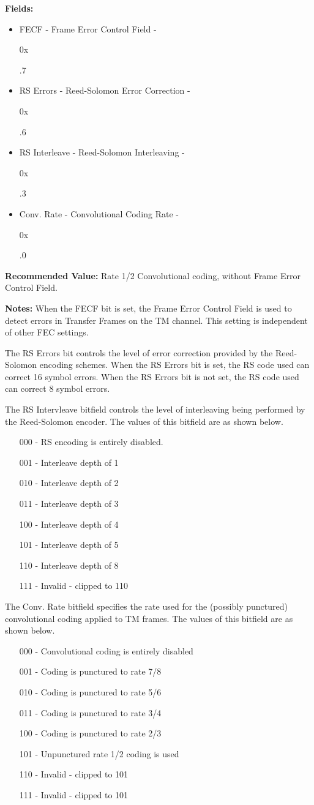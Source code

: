 \documentclass{hitec}
\newcounter{regaddr}
\newcounter{regsize}
\newcommand*{\curreg}[1][0]{%
		\addtocounter{regaddr}{\the\numexpr#1-\value{regsize}\relax}%
		0x\padzeroes[2]\Hexadecimal{regaddr}%
		\addtocounter{regaddr}{\the\numexpr\value{regsize}-#1\relax}%
}
\begin{document}
\noindent \textbf{Fields:}

\begin{itemize}
		\item FECF - Frame Error Control Field - \curreg.7
		\item RS Errors - Reed-Solomon Error Correction - \curreg.6
		\item RS Interleave - Reed-Solomon Interleaving - \curreg.3
		\item Conv. Rate - Convolutional Coding Rate - \curreg.0
\end{itemize}

\noindent \textbf{Recommended Value:} Rate 1/2 Convolutional coding, without
Frame Error Control Field.

\noindent \textbf{Notes:} When the FECF bit is set, the Frame Error Control
Field is used to detect errors in Transfer Frames on the TM channel. This
setting is independent of other FEC settings.

The RS Errors bit controls the level of error correction provided by the
Reed-Solomon encoding schemes. When the RS Errors bit is set, the RS code used
can correct 16 symbol errors. When the RS Errors bit is not set, the RS code
used can correct 8 symbol errors.

The RS Intervleave bitfield controls the level of interleaving being performed
by the Reed-Solomon encoder. The values of this bitfield are as shown below.

\begin{itemize}
		\item[000 -] RS encoding is entirely disabled.
		\item[001 -] Interleave depth of 1
		\item[010 -] Interleave depth of 2
		\item[011 -] Interleave depth of 3
		\item[100 -] Interleave depth of 4
		\item[101 -] Interleave depth of 5
		\item[110 -] Interleave depth of 8
		\item[111 -] Invalid - clipped to 110
\end{itemize}

The Conv. Rate bitfield specifies the rate used for the (possibly punctured)
convolutional coding applied to TM frames. The values of this bitfield are as
shown below.

\begin{itemize}
		\item[000 -] Convolutional coding is entirely disabled
		\item[001 -] Coding is punctured to rate 7/8 
		\item[010 -] Coding is punctured to rate 5/6
		\item[011 -] Coding is punctured to rate 3/4
		\item[100 -] Coding is punctured to rate 2/3
		\item[101 -] Unpunctured rate 1/2 coding is used
		\item[110 -] Invalid - clipped to 101
		\item[111 -] Invalid - clipped to 101
\end{itemize}
\end{document}
